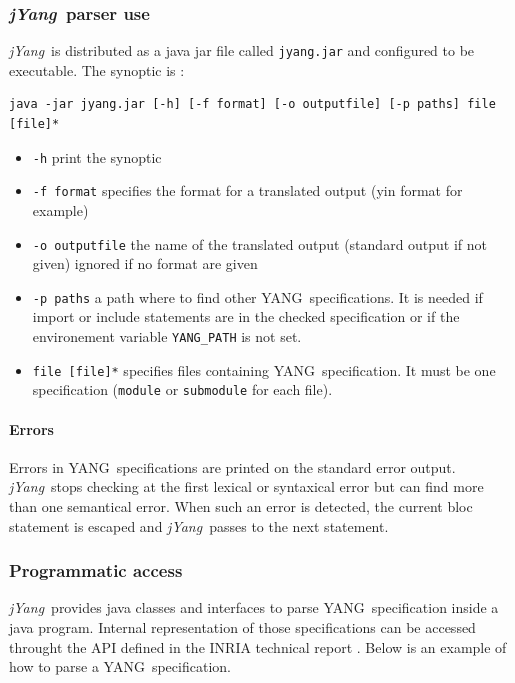 \documentclass[a4paper]{article}
\begin{document}
\subsubsection{{\sl jYang\/}\ parser use}

{\sl jYang\/}\ is distributed  as a java jar file  called {\tt jyang.jar} and
configured to be executable. The synoptic is :

\begin{verbatim}
java -jar jyang.jar [-h] [-f format] [-o outputfile] [-p paths] file [file]*
\end{verbatim}

\begin{itemize}
\item
{\tt -h} print the synoptic
\item
{\tt  -f format}  specifies the  format for  a translated  output (yin
format for example)
\item
{\tt -o outputfile} the name of the translated output (standard output
if not given) ignored if no format are given
\item
{\tt -p  paths} a path where  to find other YANG\  specifications. It is
needed   if  import  or   include  statements   are  in   the  checked
specification or  if the environement variable {\tt  YANG\_PATH} is not
set.
\item
{\tt file  [file]*} specifies  files containing YANG\  specification. It
must be  one specification ({\tt  module} or {\tt submodule}  for each
file).
\end{itemize}

\paragraph{Errors}

Errors  in YANG\  specifications  are printed  on  the standard  error
output.   {\sl  jYang\/}\  stops  checking  at the  first  lexical  or
syntaxical error  but can find  more than one semantical  error.  When
such an error  is detected, the current bloc  statement is escaped and
{\sl jYang\/}\ passes to the next statement.

\subsubsection{Programmatic access}

{\sl  jYang\/}\ provides java  classes and  interfaces to  parse YANG\
specification inside a java  program. Internal representation of those
specifications can be  accessed throught the API defined  in the INRIA
technical report \cite{}. Below is an  example of how to parse a YANG\
specification.
\end{document}
